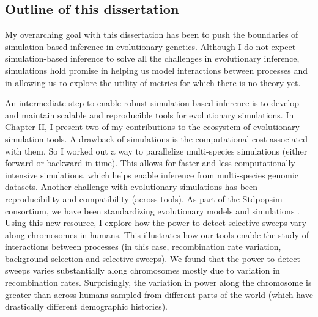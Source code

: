 
\subsection{Outline of this dissertation}

My overarching goal with this dissertation has been to push the boundaries of simulation-based inference in evolutionary genetics.
Although I do not expect simulation-based inference to solve all the challenges in evolutionary inference,
simulations hold promise in helping us model interactions between processes and in allowing us to explore the utility of metrics for which there is no theory yet.

An intermediate step to enable robust simulation-based inference is to develop and maintain scalable and reproducible tools for evolutionary simulations.
In Chapter II, I present two of my contributions to the \tskit ecosystem of evolutionary simulation tools.
A drawback of simulations is the computational cost associated with them.
So I worked out a way to parallelize multi-species simulations (either forward or backward-in-time).
This allows for faster and less computationally intensive simulations, 
which helps enable inference from multi-species genomic datasets.
Another challenge with evolutionary simulations has been reproducibility and compatibility (across tools).
As part of the Stdpopsim consortium, we have been standardizing evolutionary models and simulations \citep{adrion_community-maintained_2020, lauterbur_expanding_2023}.
Using this new resource, I explore how the power to detect selective sweeps vary along chromosomes in humans.
This illustrates how our tools enable the study of interactions between processes (in this case, recombination rate variation, background selection and selective sweeps).
We found that the power to detect sweeps varies substantially along chromosomes mostly due to variation in recombination rates.
Surprisingly, the variation in power along the chromosome is greater than across humans sampled from different parts of the world (which have drastically different demographic histories).


